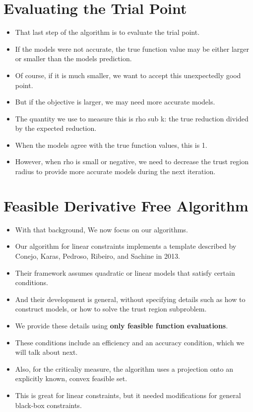\documentclass{article}
\begin{document}
	\section{Evaluating the Trial Point}
\begin{itemize}
\item That last step of the algorithm is to evaluate the trial point.
\item If the models were not accurate, the true function value may be either larger or smaller than the models prediction.
\item Of course, if it is much smaller, we want to accept this unexpectedly good point.
\item But if the objective is larger, we may need more accurate models.
\item The quantity we use to measure this is rho sub k: the true reduction divided by the expected reduction.
\item When the models agree with the true function values, this is 1.
\item However, when rho is small or negative, we need to decrease the trust region radius to provide more accurate models during the next iteration.
\end{itemize}

	
	\section{Feasible Derivative Free Algorithm}
\begin{itemize}
\item With that background, We now focus on our algorithms.
\item Our algorithm for linear constraints implements a template described by Conejo, Karas, Pedroso, Ribeiro, and Sachine in 2013. 
\item Their framework assumes quadratic or linear models that satisfy certain conditions.
\item And their development is general, without specifying details such as how to construct models, or how to solve the trust region subproblem.
\item We provide these details using \textbf{only feasible function evaluations}.
\item These conditions include an efficiency and an accuracy condition, which we will talk about next.
\item Also, for the criticaliy measure, the algorithm uses a projection onto an explicitly known, convex feasible set.
\item This is great for linear constraints, but it needed modifications for general black-box constraints.
\end{itemize}
\end{document}
